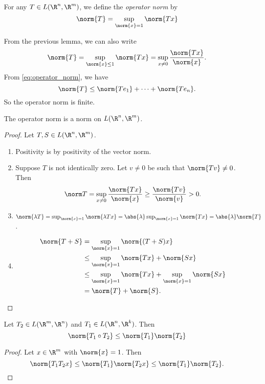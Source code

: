 \begin{definition*} \label{def:operator_norm}
    For any $T \in L(\R^n, \R^m)$, we define the \emph{operator norm} by \[
        \norm{T} = \sup_{\norm{x} = 1} \norm{Tx}
    \]
\end{definition*}
From the previous lemma, we can also write
\[
    \norm{T} = \sup_{\norm{x} \le 1} \norm{Tx}
        = \sup_{x \ne 0} \frac{\norm{Tx}}{\norm{x}}.
\]
From \cref{eq:operator_norm}, we have \[
    \norm{T} \le \norm{Te_1} + \cdots + \norm{Te_n}.
\] So the operator norm is finite.

\begin{proposition}
    The operator norm is a norm on $L(\R^n, \R^m)$.
\end{proposition}
\begin{proof}
    Let $T, S \in L(\R^n, \R^m)$.
    \begin{enumerate}[label=\small(N\arabic*)]
        \item Positivity is by positivity of the vector norm.
        \item Suppose $T$ is not identically zero.
            Let $v \ne 0$ be such that $\norm{Tv} \ne 0$.
            Then \[
                \norm T = \sup_{x \ne 0} \frac{\norm{Tx}}{\norm{x}}
                    \ge \frac{\norm{Tv}}{\norm{v}}
                    > 0.
            \]
        \item $\norm{\lambda T} = \sup_{\norm{x} = 1} \norm{\lambda Tx}
            = \abs{\lambda} \sup_{\norm{x} = 1} \norm{Tx}
            = \abs{\lambda} \norm{T}$.
        \item \begin{align*}
            \norm{T + S} &= \sup_{\norm{x} = 1} \norm{(T + S)x} \\
                &\le \sup_{\norm{x} = 1} \norm{Tx} + \norm{Sx} \\
                &\le \sup_{\norm{x} = 1} \norm{Tx}
                        + \sup_{\norm{x} = 1} \norm{Sx} \\
                &= \norm{T} + \norm{S}. \qedhere
        \end{align*}
    \end{enumerate}
\end{proof}

\begin{proposition}
    Let $T_2 \in L(\R^m, \R^n)$ and $T_1 \in L(\R^n, \R^k)$.
    Then \[
        \norm{T_1 \circ T_2} \le \norm{T_1} \norm{T_2}
    \]
\end{proposition}
\begin{proof}
    Let $x \in \R^m$ with $\norm{x} = 1$.
    Then \[
        \norm{T_1T_2 x} \le \norm{T_1} \norm{T_2 x}
                    \le \norm{T_1} \norm{T_2}. \qedhere
    \]
\end{proof}

